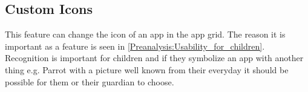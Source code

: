 \subsection{Custom Icons}
\label{backlog:custom_icons}

This feature can change the icon of an app in the app grid. The reason it is important as a feature is seen in \autoref{Preanalysis:Usability_for_children}. Recognition is important for children and if they symbolize an app with another thing e.g. Parrot with a picture well known from their everyday it should be possible for them or their guardian to choose.